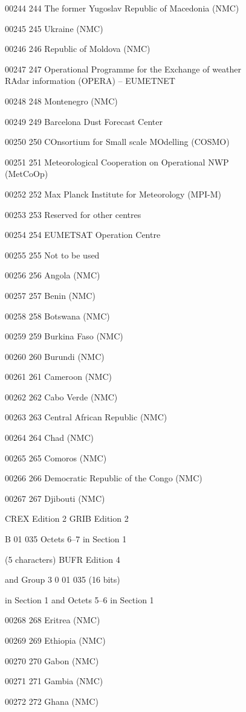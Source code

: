 00244 244 The former Yugoslav Republic of Macedonia (NMC)

00245 245 Ukraine (NMC)

00246 246 Republic of Moldova (NMC)

00247 247 Operational Programme for the Exchange of weather\\
RAdar information (OPERA) -- EUMETNET

00248 248 Montenegro (NMC)

00249 249 Barcelona Dust Forecast Center

00250 250 COnsortium for Small scale MOdelling (COSMO)

00251 251 Meteorological Cooperation on Operational NWP\\
(MetCoOp)

00252 252 Max Planck Institute for Meteorology (MPI-M)

00253 253 Reserved for other centres

00254 254 EUMETSAT Operation Centre

00255 255 Not to be used

00256 256 Angola (NMC)

00257 257 Benin (NMC)

00258 258 Botswana (NMC)

00259 259 Burkina Faso (NMC)

00260 260 Burundi (NMC)

00261 261 Cameroon (NMC)

00262 262 Cabo Verde (NMC)

00263 263 Central African Republic (NMC)

00264 264 Chad (NMC)

00265 265 Comoros (NMC)

00266 266 Democratic Republic of the Congo (NMC)

00267 267 Djibouti (NMC)

CREX Edition 2 GRIB Edition 2

B 01 035 Octets 6--7 in Section 1

(5 characters) BUFR Edition 4

and Group 3 0 01 035 (16 bits)

in Section 1 and Octets 5--6 in Section 1

00268 268 Eritrea (NMC)

00269 269 Ethiopia (NMC)

00270 270 Gabon (NMC)

00271 271 Gambia (NMC)

00272 272 Ghana (NMC)

